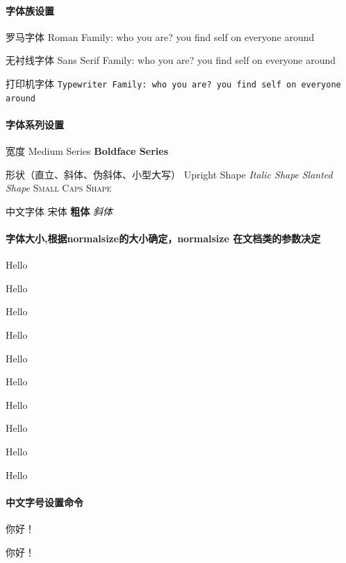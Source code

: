 \paragraph{字体族设置}
\begin{compactenum}
    \item 罗马字体 \textrm{Roman Family: who you are? you find self on everyone around}   
    \item 无衬线字体 \textsf{Sans Serif Family: who you are? you find self on everyone around}
    \item 打印机字体 \texttt{Typewriter Family: who you are? you find self on everyone around}
\end{compactenum}

\paragraph{字体系列设置}
\begin{compactenum}
    \item 宽度 \textmd{Medium Series} \textbf{Boldface Series}
    \item 形状（直立、斜体、伪斜体、小型大写） \textup{Upright Shape} \textit{Italic Shape} \textsl{Slanted Shape} \textsc{Small Caps Shape}
    \item 中文字体 {\songti 宋体}    \textbf{粗体} \textit{斜体}
\end{compactenum}

\paragraph{字体大小,根据normalsize的大小确定，normalsize 在文档类的参数决定}
\begin{compactenum}
    \item \tiny{Hello}
    \item \scriptsize{Hello}
    \item \footnotesize{Hello}
    \item \small{Hello}
    \item \normalsize{Hello}
    \item \large{Hello}
    \item \Large{Hello}
    \item \LARGE{Hello}
    \item \huge{Hello}
    \item \Huge{Hello}
\end{compactenum}

\paragraph{中文字号设置命令}
\begin{compactenum}
    \item { 你好！}
    \item { 你好！}
\end{compactenum}

